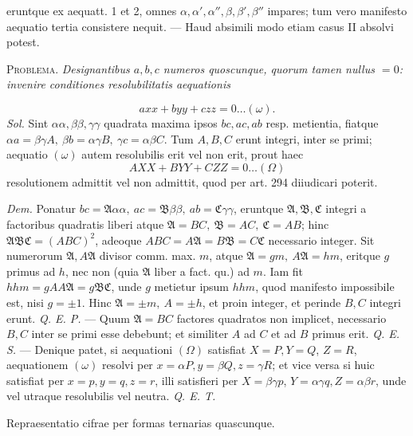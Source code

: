 eruntque ex aequatt. 1 et 2, omnes \(\alpha,\alpha',\alpha'',\beta,\beta',\beta''\) impares; tum vero manifesto aequatio tertia consistere nequit. — Haud absimili modo etiam casus II absolvi potest.

\textsc{Problema.} \textit{Designantibus \(a,b,c\) numeros quoscunque, quorum tamen nullus \(=0\): invenire conditiones resolubilitatis aequationis}

\[axx+byy+czz=0\ldots(\omega).\]
 \textit{Sol.} Sint \(\alpha\alpha,\beta\beta,\gamma\gamma\) quadrata maxima ipsos \(bc,ac,ab\) resp. metientia, fiatque \(\alpha a=\beta\gamma A,\ \beta b=\alpha\gamma B,\ \gamma c=\alpha\beta C\). Tum \(A,B,C\) erunt integri, inter se primi; aequatio \((\omega)\) autem resolubilis erit vel non erit, prout haec 
\[AXX+BYY+CZZ=0\ldots(\Omega)\]
 resolutionem admittit vel non admittit, quod per art. 294 diiudicari poterit.

\textit{Dem.} Ponatur \(bc=\mathfrak A\alpha\alpha,\ ac=\mathfrak B\beta\beta,\ ab=\mathfrak C\gamma\gamma\), eruntque \(\mathfrak A,\mathfrak B,\mathfrak C\) integri a factoribus quadratis liberi atque \(\mathfrak A=BC,\ \mathfrak B=AC,\ \mathfrak C=AB\); hinc \(\mathfrak A\mathfrak B\mathfrak C=(ABC)^2\), adeoque \(ABC=A\mathfrak A=B\mathfrak B=C\mathfrak C\) necessario integer. Sit numerorum \(\mathfrak A,A\mathfrak A\) divisor comm. max. \(m\), atque \(\mathfrak A=gm,\ A\mathfrak A=hm\), eritque \(g\) primus ad \(h\), nec non (quia \(\mathfrak A\) liber a fact. qu.) ad \(m\). Iam fit \(hhm=gAA\mathfrak A =g\mathfrak B\mathfrak C\), unde \(g\) metietur ipsum \(hhm\), quod manifesto impossibile est, nisi \(g=\pm1\). Hinc \(\mathfrak A=\pm m,\ A=\pm h\), et proin integer, et perinde \(B,C\) integri erunt. \textit{Q. E. P.} — Quum \(\mathfrak A=BC\) factores quadratos non implicet, necessario \(B,C\) inter se primi esse debebunt; et similiter \(A\) ad \(C\) et ad \(B\) primus erit. \textit{Q. E. S.} — Denique patet, si aequationi \((\Omega)\) satisfiat \(X=P,Y=Q\), \(Z=R\), aequationem \((\omega)\) resolvi per \(x=\alpha P,y=\beta Q,z=\gamma R\); et vice versa si huic satisfiat per \(x=p,y=q,z=r\), illi satisfieri per \(X=\beta\gamma p\), \(Y=\alpha\gamma q,Z=\alpha\beta r\), unde vel utraque resolubilis vel neutra. \textit{Q. E. T.}

\begin{center}Repraesentatio cifrae per formas ternarias quascunque.\end{center}



